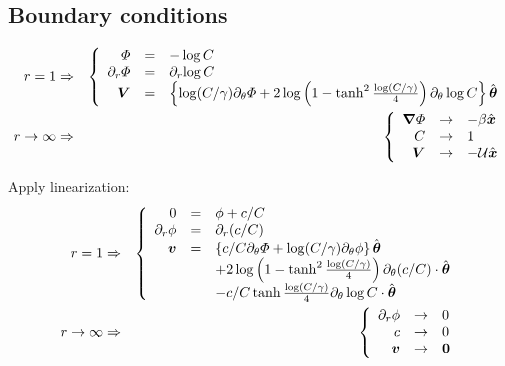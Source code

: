 \subsection{Boundary conditions}
\begin{eqnarray}
r = 1 &\Rightarrow&
\brc{rcl}{
  \varPhi & = & -\log C \\
  \partial_r {\varPhi} & = & \partial_r {\log C} \\
  \bV & = & \left\{\log (C/\gamma) \partial_\theta \varPhi +
  2 \log\left(1 - \tanh^2 \frac{\log (C/\gamma)}{4}\right)
  \partial_\theta \log C \right\} \bthetahat
}
\\
r \rightarrow \infty &\Rightarrow&
\brc{rcl}{
  \bnabla \varPhi &\rightarrow& -\beta \bxhat \\
  C &\rightarrow& 1 \\
  \bV &\rightarrow& -\mathcal{U} \bxhat
}
\end{eqnarray}

Apply linearization:
\begin{eqnarray}
r = 1 &\Rightarrow&
\brc{rcl}{
  0 & = & \phi + {c / C} \\
  \partial_r {\phi} & = &  \partial_r {(c/C)} \\
  \bv & = & \left\{c/C \partial_\theta \varPhi +
  \log (C/\gamma) \partial_\theta \phi \right\}\bthetahat
  \\ & &
  + 2 \log\left(1 - \tanh^2 \frac{\log (C/\gamma)}{4}\right)
  \partial_\theta (c/C) \cdot \bthetahat
  \\ & &
  - c/C \tanh \frac{\log (C/\gamma)}{4}
  \partial_\theta \log C \cdot \bthetahat
}
\\
r \rightarrow \infty &\Rightarrow&
\brc{rcl}{
  \partial_r \phi &\rightarrow& 0 \\
  c &\rightarrow& 0 \\
  \bv &\rightarrow& \bzero
}
\end{eqnarray}
